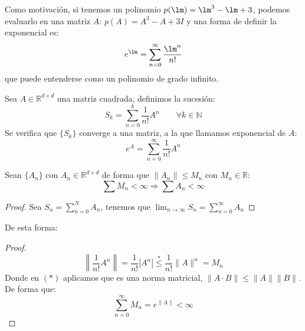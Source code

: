 \noindent %
Como motivación, si tenemos un polinomio $p(\lm) = \lm^3 -\lm +  3$, podemos evaluarlo en una matriz $A$: 
$p(A) =A^3 -A+3I$ y una forma de definir la exponencial es:
\begin{equation*}
    e^\lm = \sum_{n=0}^{\infty} \dfrac{\lm^n}{n!}
\end{equation*}
que puede entenderse como un polinomio de grado infinito.
\begin{definicion}
    Sea $A\in \mathbb{R}^{d\times d}$ una matriz cuadrada, definimos la sucesión:
    \begin{equation*}
        S_k = \sum_{n=0}^{k} \dfrac{1}{n!} A^n \qquad \forall k\in \mathbb{N}
    \end{equation*}
    Se verifica que $\{S_k\}$ converge a una matriz, a la que llamamos exponencial de $A$:
    \begin{equation*}
        e^A = \sum_{n=0}^{\infty} \dfrac{1}{n!} A^n
    \end{equation*}
\end{definicion}



\begin{prop}
    Sean $\{A_n\}$ con $A_n\in \mathbb{R}^{d\times d}$ de forma que $\|A_n\|\leq M_n$ con $M_n\in \mathbb{R}$:
    \begin{equation*}
        \sum M_n < \infty \Longrightarrow \sum A_n < \infty
    \end{equation*}
    \begin{proof}
        Sea $S_n = \sum_{n=0}^{N}A_n$, tenemos que $\lim_{n\to\infty} S_n= \sum_{n=0}^{\infty}A_n$
    \end{proof}
\end{prop}

De esta forma:
\begin{proof}
    \begin{equation*}
        \left\|\dfrac{1}{n!}A^n\right\| = \dfrac{1}{n!}\left|A^n\right| \stackrel{\ast}{\leq} \dfrac{1}{n!} \|A\|^n = M_n
    \end{equation*}
    Donde en $(\ast)$ aplicamos que es una norma matricial, $\|A\cdot B\| \leq \|A\|\|B\|$. De forma que:
    \begin{equation*}
        \sum_{n=0}^{\infty} M_n = e^{\|A\|} < \infty
    \end{equation*}
\end{proof}

